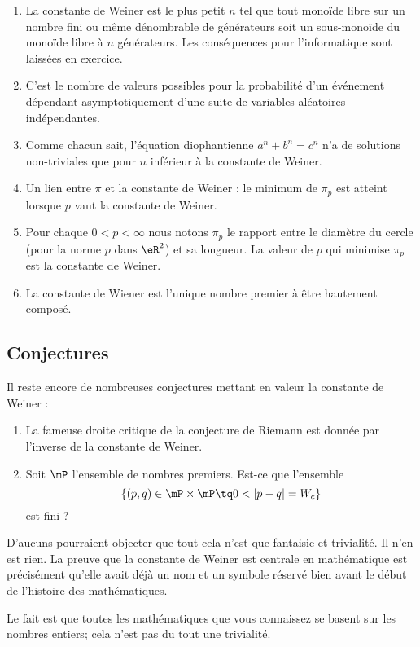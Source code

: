 \begin{enumerate}
	\item
	      La constante de Weiner est le plus petit $n$ tel que tout monoïde libre sur un nombre fini ou même dénombrable de générateurs soit un sous-monoïde du monoïde libre à $n$ générateurs. Les conséquences pour l'informatique sont laissées en exercice\cite{BIBooLZISooOgEZHk}.
	\item

	      C'est le nombre de valeurs possibles pour la probabilité d'un événement dépendant asymptotiquement d'une suite de variables aléatoires indépendantes\cite{BIBooUPYJooJzhXBO}.
	\item
	      Comme chacun sait, l'équation diophantienne $a^n + b^n = c^n$ n'a de solutions non-triviales que pour $n$ inférieur à la constante de Weiner\cite{BIBooUPYJooJzhXBO}.
	\item
	      Un lien entre \( \pi\) et la constante de Weiner : le minimum de \( \pi_p\) est atteint lorsque \( p\) vaut la constante de Weiner\cite{BIBooFSACooTqijAy}.
	\item
	      Pour chaque \( 0<p<\infty\) nous notons \( \pi_p\) le rapport entre le diamètre du cercle (pour la norme \( p\) dans \( \eR^2\)) et sa longueur.  La valeur de \( p\) qui minimise \( \pi_p\) est la constante de Weiner\cite{BIBooFSACooTqijAy}.
	\item
	      La constante de Wiener est l'unique nombre premier à être hautement composé\cite{BIBooNQXIooBexjDc}.
\end{enumerate}


\subsection{Conjectures}


Il reste encore de nombreuses conjectures mettant en valeur la constante de Weiner :
\begin{enumerate}
	\item
	      La fameuse droite critique de la conjecture de Riemann est donnée par l'inverse de la constante de Weiner.
	\item
	      Soit \( \mP\) l'ensemble de nombres premiers. Est-ce que l'ensemble
	      \begin{equation}
		      \{ (p,q)\in \mP\times \mP\tq 0<| p-q |=W_c \}
	      \end{equation}
	      est fini ?
\end{enumerate}

D'aucuns pourraient objecter que tout cela n'est que fantaisie et trivialité. Il n'en est rien. La preuve que la constante de Weiner est centrale en mathématique est précisément qu'elle avait déjà un nom et un symbole réservé bien avant le début de l'histoire des mathématiques.

Le fait est que toutes les mathématiques que vous connaissez se basent sur les nombres entiers; cela n'est pas du tout une trivialité.
